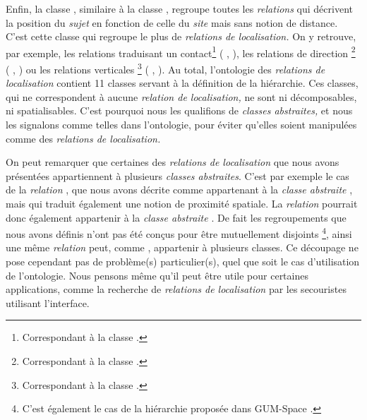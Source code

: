 Enfin, la classe
,
similaire à la classe
, regroupe
toutes les \emph{relations} qui décrivent la position du \emph{sujet}
en fonction de celle du \emph{site} mais sans notion de
distance. C'est cette classe qui regroupe le plus de \emph{relations
  de localisation.} On y retrouve, par exemple, les relations
traduisant un contact\footnote{Correspondant à la classe
  .} (\eg
{},
), les relations de direction
\footnote{Correspondant à la classe
  .} (\eg
{}, ) ou
les relations verticales \footnote{Correspondant à la classe
  .} (\eg
{}, ). Au
total, l'ontologie des \emph{relations de localisation} contient 11
classes servant à la définition de la hiérarchie. Ces classes, qui ne
correspondent à aucune \emph{relation de localisation,} ne sont ni
décomposables, ni spatialisables. C'est pourquoi nous les qualifions
de \emph{classes abstraites,} et nous les signalons comme telles dans
l'ontologie, pour éviter qu'elles soient manipulées comme des
\emph{relations de localisation.}

On peut remarquer que certaines des \emph{relations de localisation}
que nous avons présentées appartiennent à plusieurs \emph{classes
  abstraites}. C'est par exemple le cas de la \emph{relation}
, que nous avons décrite comme appartenant à la
\emph{classe abstraite}
, mais qui
traduit également une notion de proximité spatiale. La \emph{relation}
 pourrait donc également appartenir à la
\emph{classe abstraite}
. De fait les
regroupements que nous avons définis n'ont pas été conçus pour être
mutuellement disjoints \footnote{C'est également le cas de la
  hiérarchie proposée dans GUM-Space \autocite{Bateman2010}.}, ainsi
une même \emph{relation} peut, comme ,
appartenir à plusieurs classes. Ce découpage ne pose cependant pas de
problème(s) particulier(s), quel que soit le cas d'utilisation de
l'ontologie. Nous pensons même qu'il peut être utile pour certaines
applications, comme la recherche de \emph{relations de localisation}
par les secouristes utilisant l'interface.

